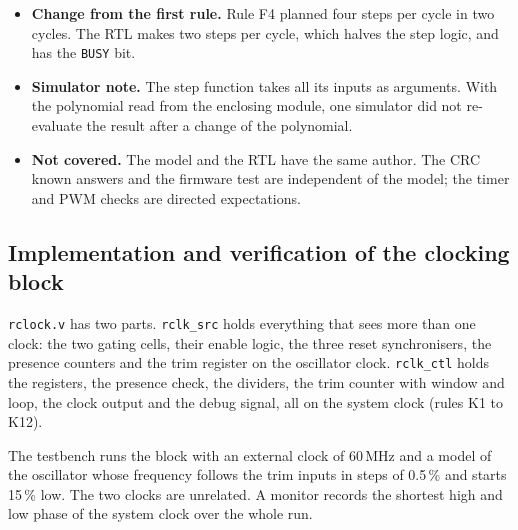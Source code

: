 \documentclass[10pt,a4paper]{article}
\newcommand{\reg}[1]{\texttt{#1}}
\begin{document}
\begin{itemize}
\item \textbf{Change from the first rule.} Rule F4 planned four steps per cycle in two cycles. The RTL makes two
steps per cycle, which halves the step logic, and has the \reg{BUSY} bit.
\item \textbf{Simulator note.} The step function takes all its inputs as arguments. With the polynomial read
from the enclosing module, one simulator did not re-evaluate the result after a change of the polynomial.
\item \textbf{Not covered.} The model and the RTL have the same author. The CRC known answers and the firmware
test are independent of the model; the timer and PWM checks are directed expectations.
\end{itemize}

\subsection{Implementation and verification of the clocking block}\label{sec:clkver}

\texttt{rclock.v} has two parts. \texttt{rclk\_src} holds everything that sees more than one clock: the two
gating cells, their enable logic, the three reset synchronisers, the presence counters and the trim register
on the oscillator clock. \texttt{rclk\_ctl} holds the registers, the presence check, the dividers, the trim
counter with window and loop, the clock output and the debug signal, all on the system clock (rules K1 to
K12).

The testbench runs the block with an external clock of 60\,MHz and a model of the oscillator whose frequency
follows the trim inputs in steps of 0.5\,\% and starts 15\,\% low. The two clocks are unrelated. A monitor
records the shortest high and low phase of the system clock over the whole run.
\end{document}
